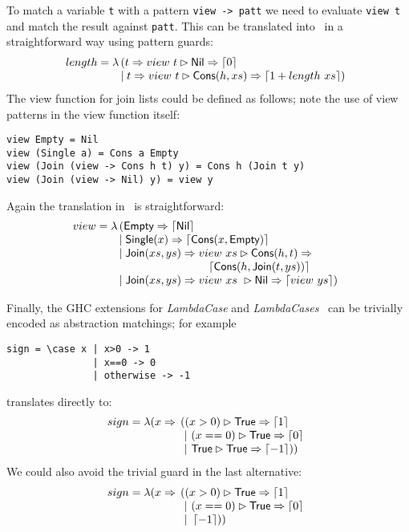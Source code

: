 To match a variable \texttt{t} with a pattern \verb|view -> patt|
we need to evaluate \verb|view t| and match the result against \verb|patt|.
This can be translated into \lambdaPMC\ in a straightforward way
using pattern guards:
\[
  length = \lambda \!\!\begin{array}[t]{l}
                     (t \Rightarrow view~t \rhd 
      \textsf{Nil} \Rightarrow \left\lceil 0\right\rceil \\
      \mid t \Rightarrow view~t \rhd \textsf{Cons}(h,xs) \Rightarrow \left\lceil 1+length~ xs\right\rceil)
    \end{array} \\
\]
The view function for join lists could be defined as follows; note the use
of view patterns in the view function itself:
\begin{verbatim}
view Empty = Nil
view (Single a) = Cons a Empty
view (Join (view -> Cons h t) y) = Cons h (Join t y)
view (Join (view -> Nil) y) = view y
\end{verbatim}
Again the translation in \lambdaPMC\ is straightforward:
\[
  view = \lambda\!\!
  \begin{array}[t]{l}
    (\textsf{Empty} \Rightarrow \left\lceil \textsf{Nil}\right\rceil \\
    \mid \textsf{Single}(x) \Rightarrow \left\lceil \textsf{Cons}(x,\textsf{Empty})\right\rceil \\
    \mid \textsf{Join}(xs,ys) \Rightarrow view~xs \rhd 
    \textsf{Cons}(h,t) \Rightarrow \\
    \qquad \qquad\qquad\qquad \left\lceil \textsf{Cons}(h,\textsf{Join}(t,ys))\right\rceil \\
    \mid \textsf{Join}(xs,ys) \Rightarrow view~xs ~ \rhd
    \textsf{Nil} \Rightarrow \left\lceil view~ys\right\rceil)
  \end{array}
\]

Finally, the GHC extensions for \emph{LambdaCase} and
\emph{LambdaCases}~\cite{ghc_guide_lambda_case} can be trivially
encoded as abstraction matchings; for example
\begin{verbatim}
sign = \case x | x>0 -> 1
               | x==0 -> 0
               | otherwise -> -1
\end{verbatim}
translates directly to:
\[ sign = \lambda (x \Rightarrow \!\!\begin{array}[t]{l}
  ((x>0) \rhd  \textsf{True} \Rightarrow \left\lceil 1\right\rceil \\
  ~|~ (x==0)\rhd \textsf{True} \Rightarrow \left\lceil 0\right\rceil\\
  ~|~ \textsf{True} \rhd \textsf{True} \Rightarrow  \left\lceil -1\right\rceil ))
 \end{array}    
\]
%
We could also avoid the trivial guard in the last alternative:
%
\[ sign = \lambda (x \Rightarrow \!\!\begin{array}[t]{l}
  ((x>0) \rhd  \textsf{True} \Rightarrow \left\lceil 1\right\rceil \\
  ~|~ (x==0)\rhd \textsf{True} \Rightarrow \left\lceil 0\right\rceil\\
  ~|~  \left\lceil -1\right\rceil ))
 \end{array}    
\]
  

